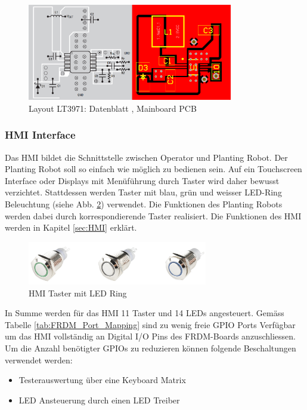 \begin{figure}[H]
	\includegraphics[width=0.8\textwidth]{Illustrationen/6-Umsetzung/LT3971_Layout.png}
	\caption{Layout LT3971: Datenblatt \protect\cite{LT3971_Datasheet}, Mainboard PCB}
	\label{fig:LT2971_Layout}
\end{figure}

\subsubsection{HMI Interface} \label{sec:Mainboard_HMI_Interface}
Das HMI bildet die Schnittstelle zwischen Operator und Planting Robot. Der Planting Robot soll so einfach wie möglich zu bedienen sein. Auf ein Touchscreen Interface oder Displays mit Menüführung durch Taster wird daher bewusst verzichtet. Stattdessen werden Taster mit blau, grün und weisser LED-Ring Beleuchtung (siehe Abb. \ref{fig:Taster_LED-Ring}) verwendet. Die Funktionen des Planting Robots werden dabei durch korrespondierende Taster realisiert. Die Funktionen des HMI werden in Kapitel \ref{sec:HMI} erklärt.
\begin{figure}[H]
	\includegraphics[width=0.7\textwidth]{Illustrationen/6-Umsetzung/HMI_LED_Taster.png}
	\caption{HMI Taster mit LED Ring \protect\cite{HMI_Taster}}
	\label{fig:Taster_LED-Ring}
\end{figure}

In Summe werden für das HMI 11 Taster und 14 LEDs angesteuert. Gemäss Tabelle \ref{tab:FRDM_Port_Mapping} sind zu wenig freie GPIO Ports Verfügbar um das HMI vollständig an Digital I/O Pins des FRDM-Boards anzuschliessen. Um die Anzahl benötigter GPIOs zu reduzieren können folgende Beschaltungen verwendet werden:
\begin{itemize}
	\item Testerauswertung über eine Keyboard Matrix
	\item LED Ansteuerung durch einen LED Treiber
\end{itemize}

